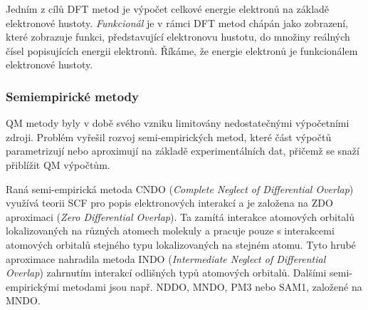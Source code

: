 Jedním z cílů DFT metod je výpočet celkové energie elektronů na základě elektronové hustoty.\textit{ Funkcionál} je v rámci DFT metod chápán jako zobrazení, které zobrazuje funkci, představující elektronovu hustotu, do množiny reálných čísel popisujících energii elektronů. Říkáme, že energie elektronů je funkcionálem elektronové hustoty. %
\subsubsection{Semiempirické metody}
QM metody byly v době svého vzniku limitovány nedostatečnými výpočetními zdroji. Problém vyřešil rozvoj semi-empirických metod, které část výpočtů parametrizují nebo aproximují na základě experimentálních dat, přičemž se snaží přiblížit QM výpočtům. 

Raná semi-empirická metoda CNDO (\textit{Complete Neglect of Differential Overlap}) využívá teorii SCF pro popis elektronových interakcí a je založena na ZDO aproximaci (\textit{Zero Differential Overlap}). Ta zamítá interakce atomových orbitalů lokalizovaných na různých atomech molekuly a pracuje pouze s interakcemi atomových orbitalů stejného typu lokalizovaných na stejném atomu. 
Tyto hrubé aproximace nahradila metoda INDO  (\textit{Intermediate Neglect of Differential Overlap}) zahrnutím interakcí odlišných typů atomových orbitalů. Dalšími semi-empirickými metodami jsou např. NDDO, MNDO, PM3 nebo SAM1, založené na MNDO. 

